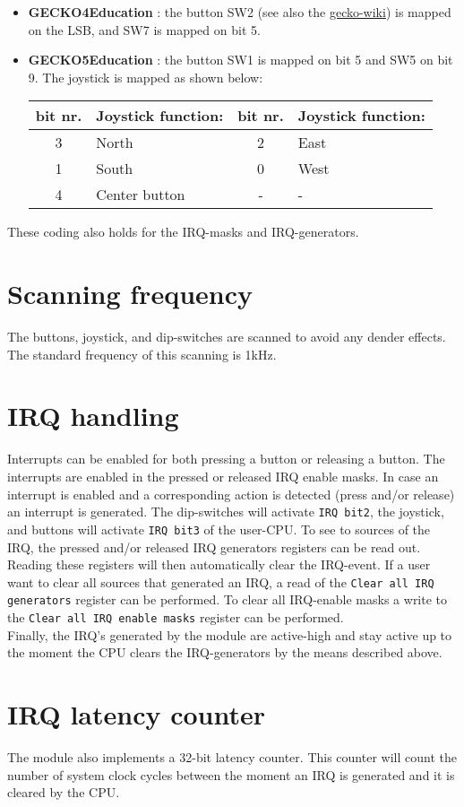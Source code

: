 \documentclass[a4paper,twoside,12pt]{article}
\begin{document}
\begin{itemize}
\item \textbf{GECKO4Education} : the button SW2 (see also the \href{https://gecko-wiki.ti.bfh.ch/gecko4education_epfl:buttons}{gecko-wiki}) is mapped on the LSB, and SW7 is mapped on bit 5.
\item \textbf{GECKO5Education} : the button SW1 is mapped on bit 5 and SW5 on bit 9. The joystick is mapped as shown below:
\begin{center}
\begin{tabular}{|c|l|c|l|}
\hline
\textbf{bit nr.}&\textbf{Joystick function:}&\textbf{bit nr.}&\textbf{Joystick function:}\\
\hline
\hline
3&North&2&East\\
\hline
1&South&0&West\\
\hline
4&Center button&-&-\\
\hline
\end{tabular}
\end{center}
\end{itemize}
These coding also holds for the IRQ-masks and IRQ-generators.
\section{Scanning frequency}
The buttons, joystick, and dip-switches are scanned to avoid any dender effects. The standard frequency of this scanning is 1kHz.
\section{IRQ handling}
Interrupts can be enabled for both pressing a button or releasing a button. The interrupts are enabled in the pressed or released IRQ enable masks. In case an interrupt is enabled and a corresponding action is detected (press and/or release) an interrupt is generated. The dip-switches will activate \texttt{IRQ bit2}, the joystick, and buttons will activate \texttt{IRQ bit3} of the user-CPU. To see to sources of the IRQ, the pressed and/or released IRQ generators registers can be read out. Reading these registers will then automatically clear the IRQ-event. If a user want to clear all sources that generated an IRQ, a read of the \texttt{Clear all IRQ generators} register can be performed. To clear all IRQ-enable masks a write to the \texttt{Clear all IRQ enable masks} register can be performed.\\
Finally, the IRQ's generated by the module are active-high and stay active up to the moment the CPU clears the IRQ-generators by the means described above.
\section{IRQ latency counter}
The module also implements a 32-bit latency counter. This counter will count the number of system clock cycles between the moment an IRQ is generated and it is cleared by the CPU.
\end{document}
